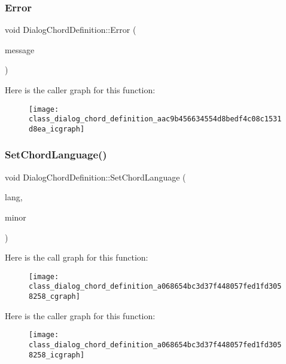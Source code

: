 \subsubsection{Error}
{\footnotesize\ttfamily void Dialog\+Chord\+Definition\+::\+Error (\begin{DoxyParamCaption}\item[{Q\+String}]{message }\end{DoxyParamCaption})\hspace{0.3cm}{\ttfamily [signal]}}

Here is the caller graph for this function\+:\nopagebreak
\begin{figure}[H]
\begin{center}
\leavevmode
\texttt{[image: class\_dialog\_chord\_definition\_aac9b456634554d8bedf4c08c1531d8ea\_icgraph]}
\end{center}
\end{figure}
\mbox{\label{class_dialog_chord_definition_a068654bc3d37f448057fed1fd3058258}} 
\subsubsection{Set\+Chord\+Language()}
{\footnotesize\ttfamily void Dialog\+Chord\+Definition\+::\+Set\+Chord\+Language (\begin{DoxyParamCaption}\item[{Q\+String}]{lang,  }\item[{Q\+String}]{minor }\end{DoxyParamCaption})}

Here is the call graph for this function\+:\nopagebreak
\begin{figure}[H]
\begin{center}
\leavevmode
\texttt{[image: class\_dialog\_chord\_definition\_a068654bc3d37f448057fed1fd3058258\_cgraph]}
\end{center}
\end{figure}
Here is the caller graph for this function\+:\nopagebreak
\begin{figure}[H]
\begin{center}
\leavevmode
\texttt{[image: class\_dialog\_chord\_definition\_a068654bc3d37f448057fed1fd3058258\_icgraph]}
\end{center}
\end{figure}
\mbox{\label{class_dialog_chord_definition_af02305bf92afaf24d635e9a73f21d087}} 
